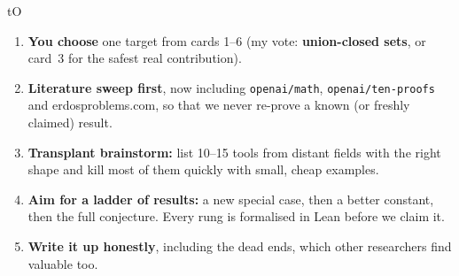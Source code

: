 \documentclass[10pt,a4paper]{article}
\begin{document}
\begin{keybox}[title={Proposed plan for the hard-problem session}]{tO}
\begin{enumerate}[leftmargin=1.3em]
\item \textbf{You choose} one target from cards 1--6 (my vote: \textbf{union-closed sets}, or card~3 for the safest real contribution).
\item \textbf{Literature sweep first}, now including \texttt{openai/math}, \texttt{openai/ten-proofs} and erdosproblems.com, so that we never re-prove a known (or freshly claimed) result.
\item \textbf{Transplant brainstorm:} list 10--15 tools from distant fields with the right shape and kill most of
  them quickly with small, cheap examples.
\item \textbf{Aim for a ladder of results:} a new special case, then a better constant, then the full conjecture.
  Every rung is formalised in Lean before we claim it.
\item \textbf{Write it up honestly}, including the dead ends, which other researchers find valuable too.
\end{enumerate}
\end{keybox}
\end{document}
